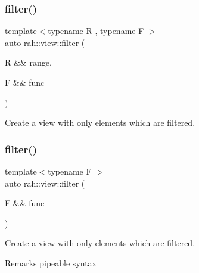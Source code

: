 \subsubsection{\texorpdfstring{filter()}{filter()}\hspace{0.1cm}{\footnotesize\ttfamily [1/2]}}
{\footnotesize\ttfamily template$<$typename R , typename F $>$ \\
auto rah\+::view\+::filter (\begin{DoxyParamCaption}\item[{R \&\&}]{range,  }\item[{F \&\&}]{func }\end{DoxyParamCaption})}



Create a view with only elements which are filtered. 


\begin{DoxyCodeInclude}{0}
\end{DoxyCodeInclude}
\mbox{\label{namespacerah_1_1view_a315ba2143c833b24d05481c68b6cf2da}} 
\subsubsection{\texorpdfstring{filter()}{filter()}\hspace{0.1cm}{\footnotesize\ttfamily [2/2]}}
{\footnotesize\ttfamily template$<$typename F $>$ \\
auto rah\+::view\+::filter (\begin{DoxyParamCaption}\item[{F \&\&}]{func }\end{DoxyParamCaption})}



Create a view with only elements which are filtered. 

\begin{DoxyRemark}{Remarks}
pipeable syntax
\end{DoxyRemark}

